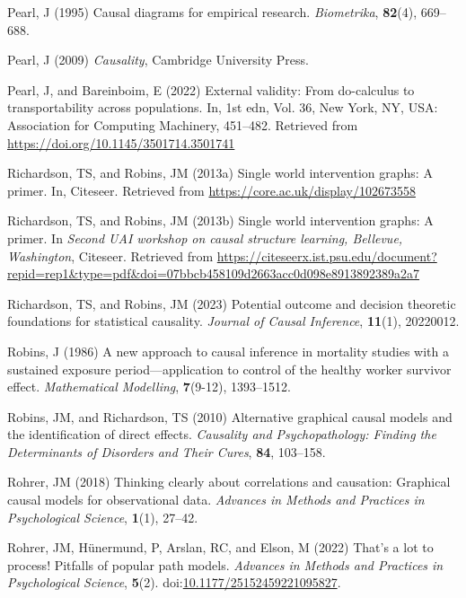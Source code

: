 \documentclass[
  single column]{article}
\newlength{\cslhangindent}
\newenvironment{CSLReferences}[2] %
 {\begin{list}{}{%
  \setlength{\itemindent}{0pt}
  \setlength{\leftmargin}{0pt}
  \setlength{\parsep}{0pt}
  \ifodd #1
   \setlength{\leftmargin}{\cslhangindent}
   \setlength{\itemindent}{-1\cslhangindent}
  \fi
  \setlength{\itemsep}{#2\baselineskip}}}
 {\end{list}}
\begin{document}
\begin{CSLReferences}{1}{0}
Pearl, J (1995) Causal diagrams for empirical research.
\emph{Biometrika}, \textbf{82}(4), 669--688.

Pearl, J (2009) \emph{Causality}, Cambridge University Press.

Pearl, J, and Bareinboim, E (2022) External validity: From do-calculus
to transportability across populations. In, 1st edn, Vol. 36, New York,
NY, USA: Association for Computing Machinery, 451--482. Retrieved from
\url{https://doi.org/10.1145/3501714.3501741}

Richardson, TS, and Robins, JM (2013a) Single world intervention graphs:
A primer. In, Citeseer. Retrieved from
\url{https://core.ac.uk/display/102673558}

Richardson, TS, and Robins, JM (2013b) Single world intervention graphs:
A primer. In \emph{Second UAI workshop on causal structure learning,
{B}ellevue, {W}ashington}, Citeseer. Retrieved from
\url{https://citeseerx.ist.psu.edu/document?repid=rep1&type=pdf&doi=07bbcb458109d2663acc0d098e8913892389a2a7}

Richardson, TS, and Robins, JM (2023) Potential outcome and decision
theoretic foundations for statistical causality. \emph{Journal of Causal
Inference}, \textbf{11}(1), 20220012.

Robins, J (1986) A new approach to causal inference in mortality studies
with a sustained exposure period---application to control of the healthy
worker survivor effect. \emph{Mathematical Modelling}, \textbf{7}(9-12),
1393--1512.

Robins, JM, and Richardson, TS (2010) Alternative graphical causal
models and the identification of direct effects. \emph{Causality and
Psychopathology: Finding the Determinants of Disorders and Their Cures},
\textbf{84}, 103--158.

Rohrer, JM (2018) Thinking clearly about correlations and causation:
Graphical causal models for observational data. \emph{Advances in
Methods and Practices in Psychological Science}, \textbf{1}(1), 27--42.

Rohrer, JM, Hünermund, P, Arslan, RC, and Elson, M (2022) That's a lot
to process! Pitfalls of popular path models. \emph{Advances in Methods
and Practices in Psychological Science}, \textbf{5}(2).
doi:\href{https://doi.org/10.1177/25152459221095827}{10.1177/25152459221095827}.


\end{CSLReferences}
\end{document}
